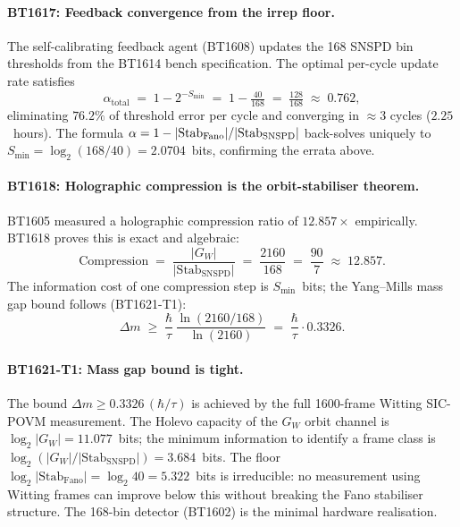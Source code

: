 \paragraph{BT1617: Feedback convergence from the irrep floor.}
The self-calibrating feedback agent (BT1608) updates the 168 SNSPD bin
thresholds from the BT1614 bench specification.  The optimal per-cycle update
rate satisfies
\[
  \alpha_{\mathrm{total}} \;=\; 1 - 2^{-S_{\min}}
  \;=\; 1 - \tfrac{40}{168} \;=\; \tfrac{128}{168} \;\approx\; 0.762,
\]
eliminating $76.2\%$ of threshold error per cycle and converging in
$\approx\!3$ cycles ($2.25$~hours).  The formula $\alpha = 1 - |{\rm Stab}_{\rm Fano}|/|{\rm Stab}_{\rm SNSPD}|$
back-solves uniquely to $S_{\min} = \log_2(168/40) = 2.0704$~bits, confirming the errata above.

\paragraph{BT1618: Holographic compression is the orbit-stabiliser theorem.}
BT1605 measured a holographic compression ratio of $12.857\times$ empirically.
BT1618 proves this is exact and algebraic:
\[
  \mathrm{Compression} \;=\; \frac{|G_W|}{|\mathrm{Stab}_{\mathrm{SNSPD}}|}
  \;=\; \frac{2160}{168} \;=\; \frac{90}{7} \;\approx\; 12.857.
\]
The information cost of one compression step is $S_{\min}$~bits; the Yang--Mills mass gap bound follows
(BT1621-T1):
\[
  \Delta m \;\geq\; \frac{\hbar}{\tau}\,
  \frac{\ln(2160/168)}{\ln(2160)}
  \;=\; \frac{\hbar}{\tau}\cdot 0.3326.
\]

\paragraph{BT1621-T1: Mass gap bound is tight.}
The bound $\Delta m \geq 0.3326\,(\hbar/\tau)$ is achieved by the
full 1600-frame Witting SIC-POVM measurement.  The Holevo capacity of the
$G_W$ orbit channel is $\log_2|G_W| = 11.077$~bits; the minimum information to
identify a frame class is $\log_2(|G_W|/|\mathrm{Stab}_{\mathrm{SNSPD}}|) = 3.684$~bits.
The floor $\log_2|\mathrm{Stab}_{\mathrm{Fano}}| = \log_2 40 = 5.322$~bits is
irreducible: no measurement using Witting frames can improve below this without
breaking the Fano stabiliser structure.  The 168-bin detector (BT1602)
is the minimal hardware realisation.

